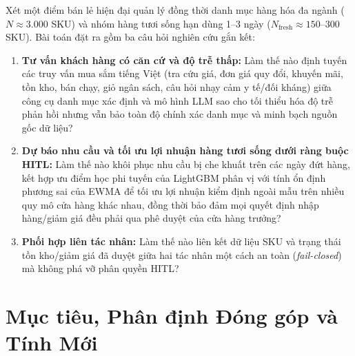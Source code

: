 Xét một điểm bán lẻ hiện đại quản lý đồng thời danh mục hàng hóa đa ngành ($N \approx 3.000$ SKU) và nhóm hàng tươi sống hạn dùng 1--3 ngày ($N_{\text{fresh}} \approx 150$--$300$ SKU). Bài toán đặt ra gồm ba câu hỏi nghiên cứu gắn kết:
\begin{enumerate}
    \item \textbf{Tư vấn khách hàng có căn cứ và độ trễ thấp:} Làm thế nào định tuyến các truy vấn mua sắm tiếng Việt (tra cứu giá, đơn giá quy đổi, khuyến mãi, tồn kho, bán chạy, giỏ ngân sách, câu hỏi nhạy cảm y tế/đối kháng) giữa công cụ danh mục xác định và mô hình LLM sao cho tối thiểu hóa độ trễ phản hồi nhưng vẫn bảo toàn độ chính xác danh mục và minh bạch nguồn gốc dữ liệu?
    \item \textbf{Dự báo nhu cầu và tối ưu lợi nhuận hàng tươi sống dưới ràng buộc HITL:} Làm thế nào khôi phục nhu cầu bị che khuất trên các ngày đứt hàng, kết hợp ưu điểm học phi tuyến của LightGBM phân vị với tính ổn định phương sai của EWMA để tối ưu lợi nhuận kiểm định ngoài mẫu trên nhiều quy mô cửa hàng khác nhau, đồng thời bảo đảm mọi quyết định nhập hàng/giảm giá đều phải qua phê duyệt của cửa hàng trưởng?
    \item \textbf{Phối hợp liên tác nhân:} Làm thế nào liên kết dữ liệu SKU và trạng thái tồn kho/giảm giá đã duyệt giữa hai tác nhân một cách an toàn (\emph{fail-closed}) mà không phá vỡ phân quyền HITL?
\end{enumerate}

\section{Mục tiêu, Phân định Đóng góp và Tính Mới}

